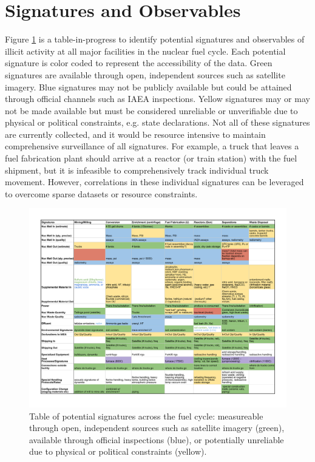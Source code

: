 \section{Signatures and Observables}
\label{s_signatures}



Figure \ref{fig:signatures} is a table-in-progress to identify potential signatures and observables of illicit activity at all major facilities in the nuclear fuel cycle.  Each potential signature is color coded to represent the accessibility of the data.  Green signatures are available through open, independent sources such as satellite imagery.  Blue signatures may not be publicly available but could be attained through official channels such as IAEA inspections.  Yellow signatures may or may not be made available but must be considered unreliable or unverifiable due to physical or political constraints, e.g. state declarations.  Not all of these signatures are currently collected, and it would be resource intensive to maintain comprehensive surveillance of all signatures.  For example, a truck that leaves a fuel fabrication plant should arrive at a reactor (or train station) with the fuel shipment, but it is infeasible to comprehensively track individual truck movement.  However, correlations in these individual signatures can be leveraged to overcome sparse datasets or resource constraints.


\begin{figure}%
\begin{center}
\includegraphics[scale=0.8, angle=90]{./figs/signatures_table.pdf}
\end{center}
\caption{Table of potential signatures across the fuel cycle: measureable through open, independent sources such as satellite imagery (green), available through official inspections (blue), or potentially unreliable due to physical or political constraints (yellow).}
\label{fig:signatures}
\end{figure}

